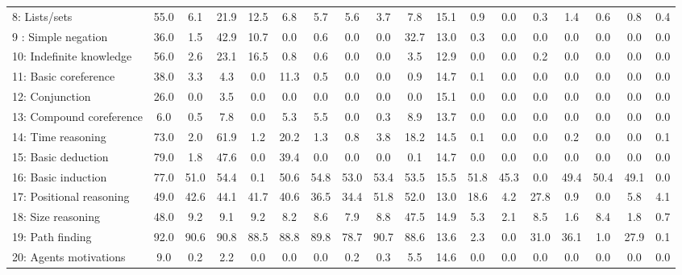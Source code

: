 \documentclass[table]{article}
\begin{document}
\begin{table}[ht]
\begin{center}
{\begin{tabular}{|l||c|c|c|c|c|c|c|c|c|c||c|c|c|c|c|c|c|}
 8: Lists/sets                  & 55.0  & 6.1   & 21.9  & 12.5  & 6.8   & 5.7   & 5.6   & 3.7   & 7.8   &15.1   & 0.9   & 0.0   & 0.3   & 1.4   & 0.6   & 0.8    &0.4\\
9 : Simple negation            & 36.0  & 1.5   & 42.9  & 10.7  & 0.0   & 0.6   & 0.0   & 0.0   & 32.7   &13.0   & 0.3   & 0.0    & 0.0   & 0.0   & 0.0   & 0.0     &0.0\\
10: Indefinite knowledge       & 56.0  & 2.6   & 23.1  & 16.5  & 0.8   & 0.6   & 0.0   & 0.0   & 3.5    &12.9   & 0.0   & 0.0    & 0.2   & 0.0   & 0.0   & 0.0     &0.0\\
 11: Basic coreference          & 38.0  & 3.3   & 4.3   & 0.0   & 11.3  & 0.5   & 0.0   & 0.0   & 0.9   &14.7   & 0.1   & 0.0   & 0.0   & 0.0   & 0.0   & 0.0    &0.0\\
 12: Conjunction                & 26.0  & 0.0   & 3.5   & 0.0   & 0.0   & 0.0   & 0.0   & 0.0   & 0.0   &15.1   & 0.0   & 0.0   & 0.0   & 0.0   & 0.0   & 0.0    &0.0\\
 13: Compound coreference       & 6.0   & 0.5   & 7.8   & 0.0   & 5.3   & 5.5   & 0.0   & 0.3   & 8.9   &13.7   & 0.0   & 0.0   & 0.0   & 0.0   & 0.0   & 0.0    &0.0\\
 14: Time reasoning             & 73.0  & 2.0   & 61.9  & 1.2   & 20.2  & 1.3   & 0.8   & 3.8   & 18.2  &14.5   & 0.1   & 0.0   & 0.0   & 0.2   & 0.0   & 0.0    &0.1\\
 15: Basic deduction            & 79.0  & 1.8   & 47.6  & 0.0   & 39.4  & 0.0   & 0.0   & 0.0   & 0.1   &14.7   & 0.0   & 0.0   & 0.0   & 0.0   & 0.0   & 0.0    &0.0\\
 16: Basic induction            & 77.0  & 51.0  & 54.4  & 0.1   & 50.6  & 54.8  & 53.0  & 53.4  & 53.5  &15.5   & 51.8  & 45.3  & 0.0   & 49.4  & 50.4  & 49.1   &0.0\\
 17: Positional reasoning       & 49.0  & 42.6  & 44.1  & 41.7  & 40.6  & 36.5  & 34.4  & 51.8  & 52.0  &13.0   & 18.6  & 4.2   & 27.8  & 0.9   & 0.0   & 5.8    &4.1\\
 18: Size reasoning             & 48.0  & 9.2   & 9.1   & 9.2   & 8.2   & 8.6   & 7.9   & 8.8   & 47.5  &14.9   & 5.3   & 2.1   & 8.5   & 1.6   & 8.4   & 1.8    &0.7\\
 19: Path finding               & 92.0  & 90.6  & 90.8  & 88.5  & 88.8  & 89.8  & 78.7  & 90.7  & 88.6  &13.6   & 2.3   & 0.0   & 31.0  & 36.1  & 1.0   & 27.9   &0.1\\
 20: Agents motivations         & 9.0   & 0.2   & 2.2   & 0.0   & 0.0   & 0.0   & 0.2   & 0.3   & 5.5   &14.6   & 0.0   & 0.0   & 0.0   & 0.0   & 0.0   & 0.0    &0.0\\

\end{tabular}}
\end{center}
\end{table}
\end{document}
